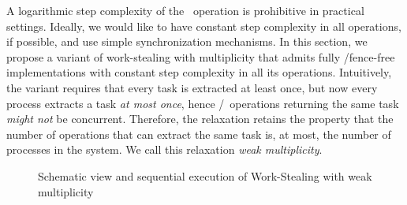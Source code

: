A logarithmic step complexity of the \Take{}~operation is prohibitive in practical settings. Ideally, we would like to have constant step complexity in all operations, if possible, and use simple synchronization mechanisms.  In this section, we propose a variant of work-stealing with multiplicity that admits fully \R/\W fence-free implementations with constant step complexity in all its operations.  Intuitively, the variant requires that every task is extracted at least once, but now every process extracts a task \emph{at most once}, hence \Take/\Steal~operations returning the same task \emph{might not} be concurrent.  Therefore, the relaxation retains the property that the number of operations that can extract the same task is, at most, the number of processes in the system.  We call this relaxation \emph{weak multiplicity}.

\begin{figure}[H]
  \centering
  \hfill
  \caption{\label{fig-weak-mult} Schematic view and sequential
    execution of Work-Stealing with weak multiplicity}
\end{figure}



